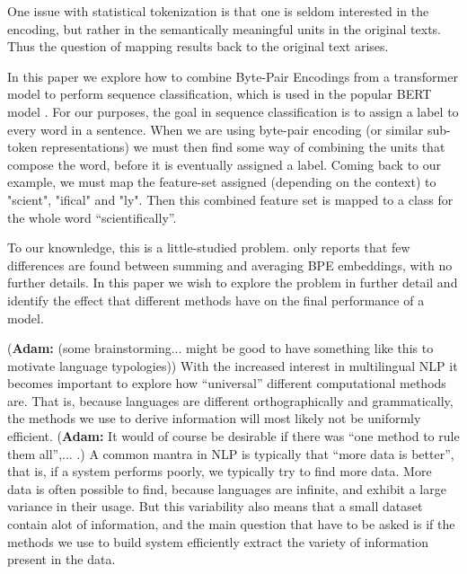 \documentclass[11pt]{article}
\newcommand\adam[1]{(\textbf{Adam:} #1)}
\newcommand\citet{\newcite}
\newcommand\citep{\cite}
\begin{document}
            One issue with statistical tokenization is that one is
     seldom interested in the encoding, but rather in the semantically
     meaningful units in the original texts. Thus the question of
     mapping results back to the original text arises.
        
        	In this paper we explore how to combine Byte-Pair
     Encodings from a transformer model to perform sequence
     classification, which is used in the popular BERT model
     \citep{devlin2018bert}. For our purposes, the goal in sequence
     classification is to assign a label to every word in a
     sentence. When we are using byte-pair encoding (or similar
     sub-token representations) we must then find some way of
     combining the units that compose the word, before it is
     eventually assigned a label. Coming back to our example, we must
     map the feature-set assigned (depending on the context) to
     "scient", "ifical" and "ly". Then this combined feature set is
     mapped to a class for the whole word ``scientifically''.

            	To our knownledge, this is a little-studied
     problem. \citet{kondratyukstraka} only reports that few
     differences are found between summing and averaging BPE
     embeddings, with no further details. In this paper we wish to
     explore the problem in further detail and identify the effect
     that different methods have on the final performance of a model.

                 \adam{(some brainstorming... might be good to have
     something like this to motivate language typologies)} With the
     increased interest in multilingual NLP it becomes important to
     explore how ``universal'' different computational methods are.
     That is, because languages are different orthographically and
     grammatically, the methods we use to derive information will most
     likely not be uniformly efficient. \adam{It would of course be desirable
     if there was ``one method to rule them all'',... .}  A common
     mantra in NLP is typically that ``more data is better'', that is,
     if a system performs poorly, we typically try to
     find more data. More data is often possible to find, because languages are
     infinite, and exhibit a large variance in their usage. But this variability
     also means that a small dataset contain alot of information, and
     the main question that have to be asked is if the methods we use
     to build system efficiently extract the variety of information
     present in the data.
\end{document}
